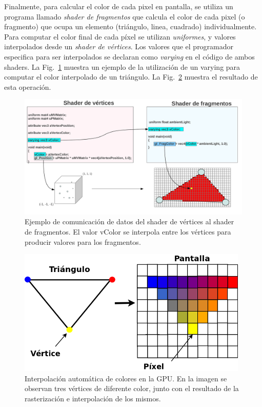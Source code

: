 Finalmente, para calcular el color de cada pixel en pantalla, se utiliza un programa llamado \emph{shader de fragmentos} que calcula el color de cada pixel (o fragmento) que ocupa un elemento (triángulo, linea, cuadrado) individualmente.
Para computar el color final de cada píxel se utilizan \emph{uniformes}, y valores interpolados desde un \emph{shader de vértices}.
Los valores que el programador especifica para ser interpolados se declaran como \emph{varying} en el código de ambos shaders.
La Fig.~\ref{fg:varying} muestra un ejemplo de la utilización de un varying para computar el color interpolado de un triángulo.
La Fig.~\ref{fg:interpolation} muestra el resultado de esta operación.


\begin{figure}[h]
\begin{center}
\includegraphics[width=13cm]{figures/varying}
\end{center}
\caption{Ejemplo de comunicación de datos del shader de vértices al shader de fragmentos. El valor vColor se interpola entre los vértices para producir valores para los fragmentos.}
\label{fg:varying}
\end{figure}

\begin{figure}[h]
\begin{center}
\includegraphics[width=11cm]{figures/interpolation}
\end{center}
\caption[Interpolación automática de colores en la GPU.]{Interpolación automática de colores en la GPU. En la imagen se observan tres vértices de diferente color, junto con el resultado de la rasterización e interpolación de los mismos.}
\label{fg:interpolation}
\end{figure}

